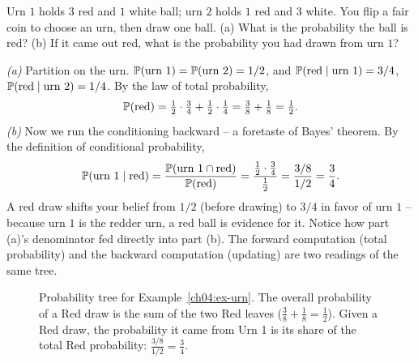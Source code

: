 \begin{example}
\label{ch04:ex-urn}
Urn $1$ holds $3$ red and $1$ white ball; urn $2$ holds $1$ red and $3$ white. You flip a fair coin to choose an urn, then draw one ball. (a) What is the probability the ball is red? (b) If it came out red, what is the probability you had drawn from urn $1$?

\emph{(a)} Partition on the urn. $\P(\text{urn }1) = \P(\text{urn }2) = 1/2$, and $\P(\text{red}\given \text{urn }1) = 3/4$, $\P(\text{red}\given \text{urn }2) = 1/4$. By the law of total probability,
\[
\P(\text{red}) = \tfrac12\cdot\tfrac34 + \tfrac12\cdot\tfrac14 = \tfrac38 + \tfrac18 = \tfrac12.
\]
\emph{(b)} Now we run the conditioning backward -- a foretaste of Bayes' theorem. By the definition of conditional probability,
\[
\P(\text{urn }1\given \text{red}) = \frac{\P(\text{urn }1 \cap \text{red})}{\P(\text{red})}
= \frac{\tfrac12\cdot\tfrac34}{\tfrac12} = \frac{3/8}{1/2} = \frac34.
\]
A red draw shifts your belief from $1/2$ (before drawing) to $3/4$ in favor of urn $1$ -- because urn $1$ is the redder urn, a red ball is evidence for it. Notice how part (a)'s denominator fed directly into part (b). The forward computation (total probability) and the backward computation (updating) are two readings of the same tree.

\begin{figure}[H]
\centering
{}
\caption{Probability tree for Example~\ref{ch04:ex-urn}. The overall probability of a Red draw is the sum of the two Red leaves ($\frac{3}{8} + \frac{1}{8} = \frac{1}{2}$). Given a Red draw, the probability it came from Urn 1 is its share of the total Red probability: $\frac{3/8}{1/2} = \frac{3}{4}$.}
\label{ch04:fig-urn}
\end{figure}
\end{example}


